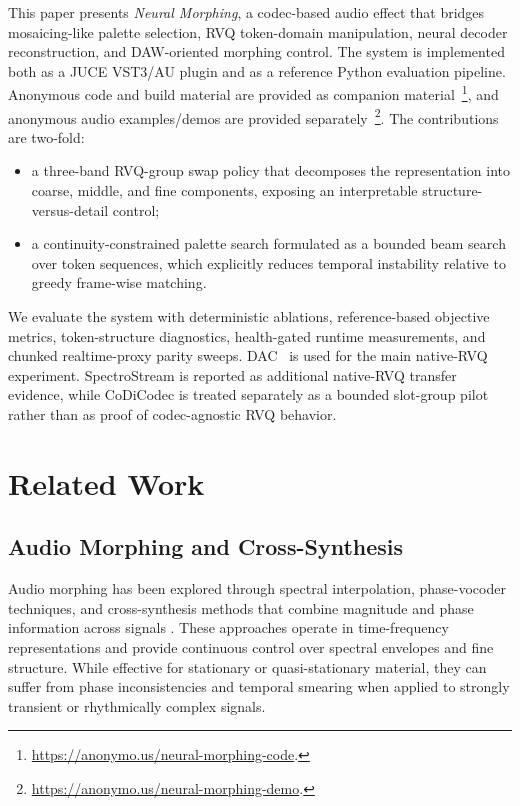 \documentclass[twoside,a4paper]{article}
\begin{document}
This paper presents \emph{Neural Morphing}, a codec-based audio effect that bridges mosaicing-like palette selection, RVQ token-domain manipulation, neural decoder reconstruction, and DAW-oriented morphing control. The system is implemented both as a JUCE VST3/AU plugin and as a reference Python evaluation pipeline. Anonymous code and build material are provided as companion material~\footnote{\url{https://anonymo.us/neural-morphing-code}.}, and anonymous audio examples/demos are provided separately~\footnote{\url{https://anonymo.us/neural-morphing-demo}.}. The contributions are two-fold:

\begin{itemize}
    \item a three-band RVQ-group swap policy that decomposes the representation into coarse, middle, and fine components, exposing an interpretable structure-versus-detail control;
    \item a continuity-constrained palette search formulated as a bounded beam search over token sequences, which explicitly reduces temporal instability relative to greedy frame-wise matching.
\end{itemize}

We evaluate the system with deterministic ablations, reference-based objective metrics, token-structure diagnostics, health-gated runtime measurements, and chunked realtime-proxy parity sweeps. DAC~\cite{Kumar:2023:DAC} is used for the main native-RVQ experiment. SpectroStream is reported as additional native-RVQ transfer evidence, while CoDiCodec is treated separately as a bounded slot-group pilot rather than as proof of codec-agnostic RVQ behavior.


\section{Related Work}

\subsection{Audio Morphing and Cross-Synthesis}

Audio morphing has been explored through spectral interpolation, phase-vocoder techniques, and cross-synthesis methods that combine magnitude and phase information across signals \cite{Serra:1990:SpectralInterpolation}. These approaches operate in time-frequency representations and provide continuous control over spectral envelopes and fine structure. While effective for stationary or quasi-stationary material, they can suffer from phase inconsistencies and temporal smearing when applied to strongly transient or rhythmically complex signals.
\end{document}
